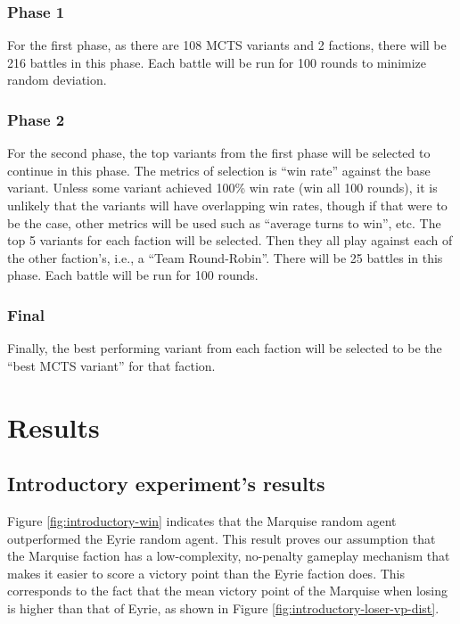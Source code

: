 \subsubsection{Phase 1}
For the first phase, as there are 108 MCTS variants and 2 factions, there will be 216 battles in this phase. Each battle will be run for 100 rounds to minimize random deviation.

\subsubsection{Phase 2}
For the second phase, the top variants from the first phase will be selected to continue in this phase. The metrics of selection is ``win rate'' against the base variant. Unless some variant achieved 100\% win rate (win all 100 rounds), it is unlikely that the variants will have overlapping win rates, though if that were to be the case, other metrics will be used such as ``average turns to win'', etc. The top 5 variants for each faction will be selected. Then they all play against each of the other faction's, i.e., a ``Team Round-Robin''. There will be 25 battles in this phase. Each battle will be run for 100 rounds.

\subsubsection{Final}
Finally, the best performing variant from each faction will be selected to be the ``best MCTS variant'' for that faction.



\section{Results}

\subsection{Introductory experiment's results}

Figure \ref{fig:introductory-win} indicates that the Marquise random agent outperformed the Eyrie random agent. This result proves our assumption that the Marquise faction has a low-complexity, no-penalty gameplay mechanism that makes it easier to score a victory point than the Eyrie faction does. This corresponds to the fact that the mean victory point of the Marquise when losing is higher than that of Eyrie, as shown in Figure \ref{fig:introductory-loser-vp-dist}.

